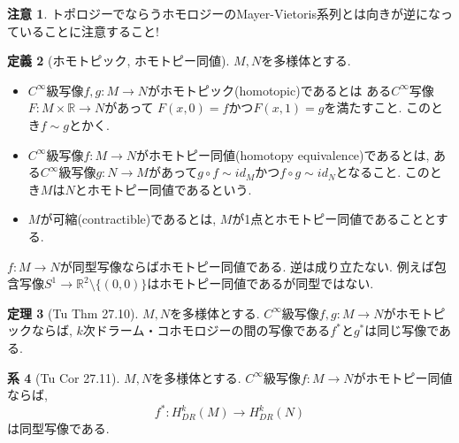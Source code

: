 \documentclass[dvipdfmx,a4paper,11pt]{article}
\newcommand{\R}{\mathbb{R}}
\theoremstyle{definition}
\newtheorem{thm}{定理}
\newtheorem{cor}[thm]{系}
\newtheorem{dfn}[thm]{定義}
\newtheorem{rema}[thm]{注意}
\begin{document}
\begin{rema}
トポロジーでならうホモロジーのMayer-Vietoris系列とは向きが逆になっていることに注意すること! 
\end{rema}


\begin{tcolorbox}[
    colback = white,
    colframe = green!35!black,
    fonttitle = \bfseries,
    breakable = true]
\begin{dfn}[ホモトピック, ホモトピー同値]
$M,N$を多様体とする. 
\begin{itemize}
 \setlength{\parskip}{0cm}
  \setlength{\itemsep}{2pt}
  \item $C^\infty$級写像$f, g: M \to N$がホモトピック(homotopic)であるとは
ある$C^\infty$写像$F : M \times \R \to N$があって
$F(x,0) = f$かつ$F(x,1)=g$を満たすこと. このとき$f \sim g$とかく. 
\item $C^\infty$級写像$f : M \to N$がホモトピー同値(homotopy equivalence)であるとは, ある$C^\infty$級写像$g : N \to M$があって$g \circ f \sim id_{M}$かつ$f \circ g \sim id_{N}$となること. このとき$M$は$N$とホモトピー同値であるという. 
\item $M$が可縮(contractible)であるとは, $M$が1点とホモトピー同値であることとする. 
\end{itemize}
\end{dfn}
\end{tcolorbox}  

$f : M \to N$が同型写像ならばホモトピー同値である. 逆は成り立たない. 例えば包含写像$S^1 \to \R^{2} \setminus \{ (0,0)\}$はホモトピー同値であるが同型ではない. 



\begin{tcolorbox}[
    colback = white,
    colframe = green!35!black,
    fonttitle = \bfseries,
    breakable = true]
\begin{thm}[Tu Thm 27.10]
$M,N$を多様体とする. $C^\infty$級写像$f, g: M \to N$がホモトピックならば, $k$次ドラーム・コホモロジーの間の写像である$f^{*}$と$g^{*}$は同じ写像である. 
\end{thm}
\end{tcolorbox} 

\begin{tcolorbox}[
    colback = white,
    colframe = green!35!black,
    fonttitle = \bfseries,
    breakable = true]
\begin{cor}[Tu Cor 27.11]
$M,N$を多様体とする. $C^\infty$級写像$f : M \to N$がホモトピー同値ならば, 
$$
f^{*} : H^{k}_{DR}(M) \to H^{k}_{DR}(N) 
$$
は同型写像である. 
\end{cor}
\end{tcolorbox} 
\end{document}
